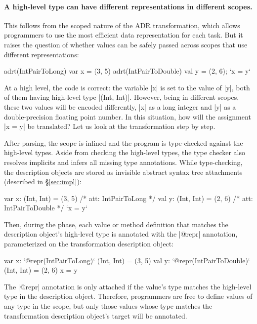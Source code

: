 \paragraph*{A high-level type can have different representations in different scopes.} This follows from the scoped nature of the ADR transformation, which allows programmers to use the most efficient data representation for each task. But it raises the question of whether values can be safely passed across scopes that use different representations:

\begin{lstlisting-nobreak}
adrt(IntPairToLong)   { var x = (3, 5) }
adrt(IntPairToDouble) { val y = (2, 6); `x = y` }
\end{lstlisting-nobreak}

At a high level, the code is correct: the variable |x| is set to the value of |y|, both of them having high-level type |(Int, Int)|. However, being in different scopes, these two values will be encoded differently, |x| as a long integer and |y| as a double-precision floating point number. In this situation, how will the assignment |x = y| be translated? Let us look at the transformation step by step.

After parsing, the scope is inlined and the program is type-checked against the high-level types. Aside from checking the high-level types, the type checker also resolves implicits and infers all missing type annotations. While type-checking, the description objects are stored as invisible abstract syntax tree attachments (described in \S\ref{sec:impl}):

\begin{lstlisting-nobreak}
var x: (Int, Int) = (3, 5) /* att: IntPairToLong */
val y: (Int, Int) = (2, 6) /* att: IntPairToDouble */
`x = y`
\end{lstlisting-nobreak}

Then, during the \inject{} phase, each value or method definition that matches the description object's high-level type is annotated with the |@repr| annotation, parameterized on the transformation description object:

\begin{lstlisting-nobreak}
var x: `@repr(IntPairToLong)` (Int, Int) = (3, 5)
val y: `@repr(IntPairToDouble)` (Int, Int) = (2, 6)
x = y
\end{lstlisting-nobreak}

The |@repr| annotation is only attached if the value's type matches the high-level type in the description object. Therefore, programmers are free to define values of any type in the scope, but only those values whose type matches the transformation description object's target will be annotated.

